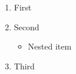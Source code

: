 \documentclass{article}
\begin{document}
\begin{enumerate}
\item First
\item Second
\begin{itemize} %
\item Nested item
\end{itemize}
\item Third
\end{enumerate}
\end{document}
